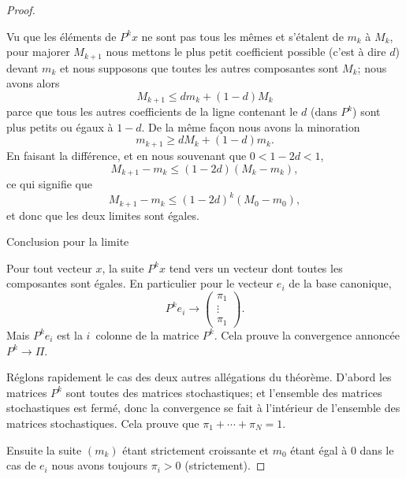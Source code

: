 \begin{proof}
\begin{subproof}
            Vu que les éléments de \( P^kx\) ne sont pas tous les mêmes et s'étalent de \( m_k\) à \( M_k\), pour majorer \( M_{k+1}\) nous mettons le plus petit coefficient possible (c'est à dire \( d\)) devant \( m_k\) et nous supposons que toutes les autres composantes sont \( M_k\); nous avons alors
            \begin{equation}
                M_{k+1}\leq dm_k+(1-d)M_k
            \end{equation}
            parce que tous les autres coefficients de la ligne contenant le \( d\) (dans \( P^k\)) sont plus petits ou égaux à \( 1-d\). De la même façon nous avons la minoration
            \begin{equation}
                m_{k+1}\geq dM_k+(1-d)m_k.
            \end{equation}
            En faisant la différence, et en nous souvenant que \( 0<1-2d<1\),
            \begin{equation}
                M_{k+1}-m_k\leq (1-2d)(M_k-m_k),
            \end{equation}
            ce qui signifie que
            \begin{equation}
                M_{k+1}-m_k\leq (1-2d)^k(M_0-m_0),
            \end{equation}
            et donc que les deux limites sont égales.

        \item[Conclusion pour la limite]

            Pour tout vecteur \( x\), la suite \( P^kx\) tend vers un vecteur dont toutes les composantes sont égales. En particulier pour le vecteur \( e_i\) de la base canonique,
            \begin{equation}
                P^ke_i\to\begin{pmatrix}
                    \pi_1    \\ 
                    \vdots    \\ 
                    \pi_1    
                \end{pmatrix}.
            \end{equation}
            Mais \( P^ke_i\) est la \( i\)\ieme\ colonne de la matrice \( P^k\). Cela prouve la convergence annoncée \( P^k\to \Pi\).
    \end{subproof}

    Réglons rapidement le cas des deux autres allégations du théorème. D'abord les matrices \( P^k\) sont toutes des matrices stochastiques; et l'ensemble des matrices stochastiques est fermé, donc la convergence se fait à l'intérieur de l'ensemble des matrices stochastiques. Cela prouve que \( \pi_1+\cdots +\pi_N=1\).

    Ensuite la suite \( (m_k)\) étant strictement croissante et \( m_0\) étant égal à \( 0\) dans le cas de \( e_i\) nous avons toujours \( \pi_i>0\) (strictement).
\end{proof}

